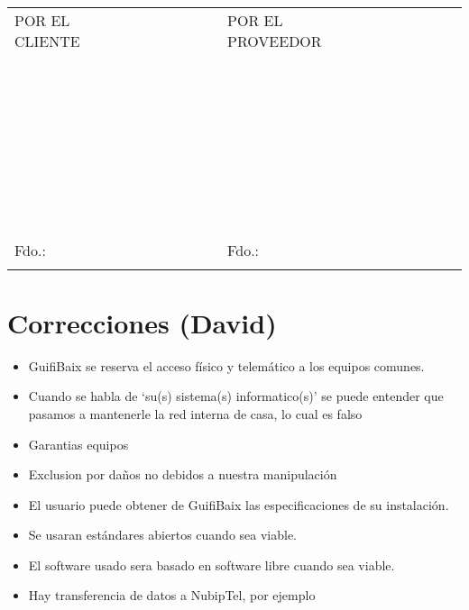 \documentclass['12pt',spanish,a4paper,]{article}
\begin{document}
~

\begin{longtable}[c]{@{}llllllllllllll@{}}
\toprule\addlinespace
POR EL CLIENTE & & & & & & & POR EL PROVEEDOR & & & & & &
\\\addlinespace
~ & ~ & ~ & ~ & ~ & ~ & ~ & ~ & ~ & ~ & ~ & ~ & ~ & ~
\\\addlinespace
~ & ~ & ~ & ~ & ~ & ~ & ~ & ~ & ~ & ~ & ~ & ~ & ~ & ~
\\\addlinespace
~ & ~ & ~ & ~ & ~ & ~ & ~ & ~ & ~ & ~ & ~ & ~ & ~ & ~
\\\addlinespace
~ & ~ & ~ & ~ & ~ & ~ & ~ & ~ & ~ & ~ & ~ & ~ & ~ & ~
\\\addlinespace
~ & ~ & ~ & ~ & ~ & ~ & ~ & ~ & ~ & ~ & ~ & ~ & ~ & ~
\\\addlinespace
~ & ~ & ~ & ~ & ~ & ~ & ~ & ~ & ~ & ~ & ~ & ~ & ~ & ~
\\\addlinespace
~ & ~ & ~ & ~ & ~ & ~ & ~ & ~ & ~ & ~ & ~ & ~ & ~ & ~
\\\addlinespace
Fdo.: & & & & & & & Fdo.: & & & & & &
\\\addlinespace
\bottomrule
\end{longtable}

\section{Correcciones (David)}\label{correcciones-david}

\begin{itemize}
\itemsep1pt\parskip0pt
\item
  GuifiBaix se reserva el acceso físico y telemático a los equipos
  comunes.
\item
  Cuando se habla de `su(s) sistema(s) informatico(s)' se puede entender
  que pasamos a mantenerle la red interna de casa, lo cual es falso
\item
  Garantias equipos
\item
  Exclusion por daños no debidos a nuestra manipulación
\item
  El usuario puede obtener de GuifiBaix las especificaciones de su
  instalación.
\item
  Se usaran estándares abiertos cuando sea viable.
\item
  El software usado sera basado en software libre cuando sea viable.
\item
  Hay transferencia de datos a NubipTel, por ejemplo
\end{itemize}
\end{document}
